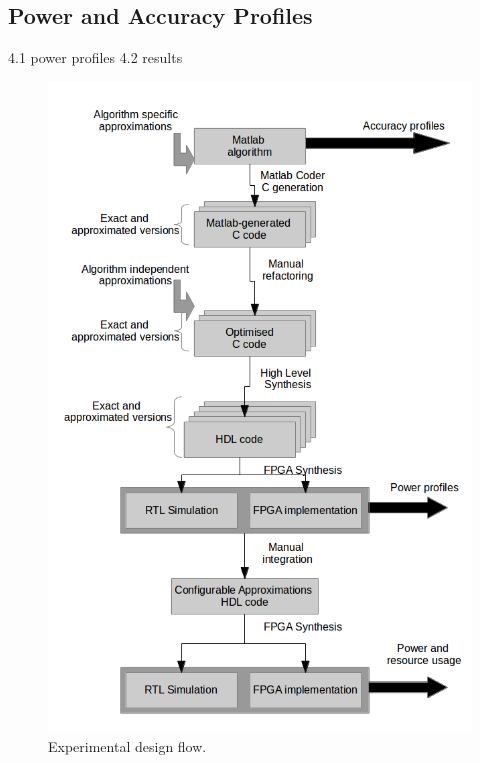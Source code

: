 \subsection{Power and Accuracy Profiles}\label{subsec:profiles}
4.1 power profiles
4.2 results

\begin{figure}[tb]
  \centering
  \includegraphics[width=0.9\columnwidth]{img/experimental_flow.png}
  \caption{Experimental design flow.}
  \label{fig:experimental_flow}
\end{figure}

